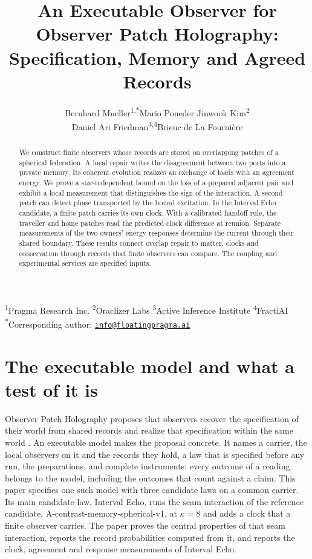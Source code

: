 \documentclass[11pt]{article}
\title{An Executable Observer for Observer Patch Holography:\\
Specification, Memory and Agreed Records}
\author{Bernhard Mueller\textsuperscript{1,*}\qquad Mario Poneder\qquad
Jinwook Kim\textsuperscript{2}\\
Daniel Ari Friedman\textsuperscript{3,4}\qquad Brieuc de La Fournière}
\date{\OPHPaperReleaseDate}
\theoremstyle{definition}
\theoremstyle{remark}
\theoremstyle{plain}
\begin{document}
\maketitle
\OPHPaperReleaseBanner

\begin{center}
\footnotesize
\textsuperscript{1}Pragma Research Inc.\quad
\textsuperscript{2}Oraclizer Labs\quad
\textsuperscript{3}Active Inference Institute\quad
\textsuperscript{4}FractiAI\\
\textsuperscript{*}Corresponding author:
\href{mailto:info@floatingpragma.ai}{\nolinkurl{info@floatingpragma.ai}}
\end{center}

\begin{abstract}
We construct finite observers whose records are stored on overlapping patches of
a spherical federation. A local repair writes the disagreement between two
ports into a private memory. Its coherent evolution realizes an exchange of
loads with an agreement energy. We prove a size-independent bound on the
loss of a prepared adjacent pair and exhibit a local measurement that
distinguishes the sign of the interaction. A second patch can detect phase
transported by the bound excitation. In the Interval Echo candidate, a
finite patch carries its own clock. With a calibrated handoff rule, the
traveller and home patches read the predicted clock difference at reunion.
Separate measurements of the two owners' energy responses determine the
current through their shared boundary. These results connect overlap repair
to matter, clocks and conservation through records that finite observers can
compare. The coupling and experimental services are specified inputs.
\end{abstract}


\section{The executable model and what a test of it is}
\label{sec:intro}

Observer Patch Holography proposes that observers recover the specification
of their world from shared records and realize that specification within
the same world \cite{flagship,ophobservers}. An executable model makes the
proposal concrete. It names a carrier, the local observers on it and the
records they hold, a law that is specified before any run, the preparations,
and complete instruments: every outcome of a reading belongs to the model,
including the outcomes that count against a claim. This paper specifies one
such model with three candidate laws on a common carrier. Its main
candidate law, Interval Echo, runs the seam interaction of the reference
candidate, A-contrast-memory-spherical-v1, at $\kappa=8$ and adds a clock
that a finite observer carries. The paper proves the central properties of
that seam interaction, reports the record probabilities computed from it,
and reports the clock, agreement and response measurements of Interval
Echo.
\end{document}
